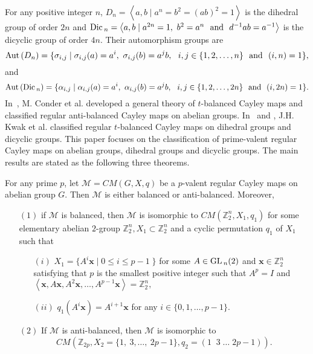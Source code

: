 \documentclass[12pt]{amsart}
\begin{document}
For any positive integer $n$, $D_n = \left< a, b \mid a^n = b^2 = (ab)^2 = 1
\right>$ is the dihedral group of order $2n$ and ${\mbox{\rm Dic\,}}_n =\left<
a, b \mid a^{2n} = 1, \ b^2=a^n ~~\mbox{and}~~d^{-1}ab=a^{-1}
\right>$ is the dicyclic group of order $4n$. Their automorphism
groups are $${\mbox{\rm Aut\,}}(D_n)= \{ \sigma_{i,j} \mid \sigma_{i,j}(a) =
a^i, ~ \sigma_{i,j}(b) =
 a^jb, ~~i,j \in \{1,2,\ldots,n \} ~~{\rm
and~~} (i,n) = 1 \},$$ and
$${\mbox{\rm Aut\,}}({\mbox{\rm Dic\,}}_n)= \{ \alpha_{i,j} \mid \alpha_{i,j}(a) =
a^i, ~ \alpha_{i,j}(b) =
 a^jb, ~~i,j \in \{1,2,\ldots,2n \} ~~{\rm
and~~} (i,2n) = 1 \}.$$
 In~\cite{CJT}, M. Conder et al.
developed a general theory of $t$-balanced Cayley maps and
classified regular anti-balanced Cayley maps on abelian groups.
In~\cite{KKF} and \cite{KO}, J.H. Kwak et al. classified regular
$t$-balanced Cayley maps on dihedral groups and dicyclic groups.
This paper focuses on the classification of prime-valent regular
Cayley maps on abelian groups, dihedral groups and dicyclic
groups. The main results are stated as the following three
theorems.

\begin{theorem} \label{main-abelian}
For any prime $p$, let $\mathcal{ M} = CM(G, X, q)$ be a
$p$-valent regular Cayley maps on abelian group $G$. Then
$\mathcal{M}$ is either balanced or anti-balanced. Moreover,
\begin{enumerate} \item[$(1)$] if $\mathcal{ M}$ is balanced, then
$\mathcal{ M}$ is isomorphic to $CM(\mathbb{Z}_{2}^{n}, X_1, q_1)$
for some elementary abelian $2$-group $\mathbb{Z}_{2}^{n}, X_1
\subset \mathbb{Z}_{2}^{n}$ and a cyclic permutation $q_1$ of $X_1$
such that
\begin{enumerate} \item[$(i)$] $X_1 = \{A^i \mathbf{x} \mid  0 \leq i \leq
p-1\; \}$ for some $A \in {\mbox{\rm GL\,}}_n(2)$ and $\mathbf{x} \in
\mathbb{Z}_{2}^{n}$ satisfying that $p$ is the smallest positive
integer such that $A^{p} = I$ and $\left< \mathbf{x}, A
\mathbf{x}, A^2 \mathbf{x}, \ldots, A^{p-1}\mathbf{x} \right> =
\mathbb{Z}_{2}^{n},$

 \item[$(ii)$]
 $q_1(A^i \mathbf{x}) = A^{i+1} \mathbf{x}$
for any $i \in \{0,1,\ldots,p-1\}$. \end{enumerate}

 \item[$(2)$]
If $\mathcal{ M}$ is anti-balanced, then $\mathcal{ M}$ is isomorphic
to
$$CM(\mathbb{Z}_{2p}, X_2 = \{ 1,\ 3, \ldots, \ 2p-1 \}, q_2 =
(1\;\;3\; \ldots \;2p-1)).$$
\end{enumerate}
\end{theorem}
\end{document}
